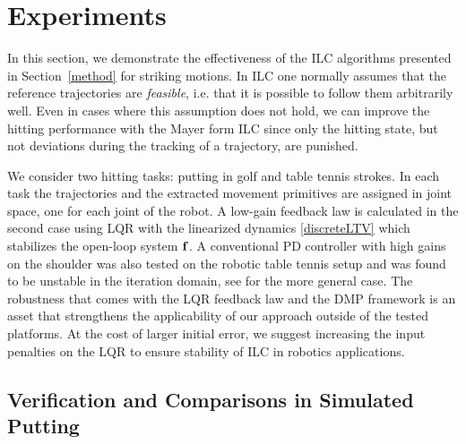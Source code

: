 \section{Experiments}\label{experiments}


In this section, we demonstrate the effectiveness of the ILC algorithms presented in Section~\ref{method} for striking motions. In ILC one normally assumes that the reference trajectories are \emph{feasible}, i.e. that it is possible to follow them arbitrarily well. Even in cases where this assumption does not hold, we can improve the hitting performance with the Mayer form ILC since only the hitting state, but not deviations during the tracking of a trajectory, are punished.

We consider two hitting tasks: putting in golf and table tennis strokes. In each task the trajectories and the extracted movement primitives are assigned in joint space, one for each joint of the robot. A low-gain feedback law is calculated in the second case using LQR with the linearized dynamics \eqref{discreteLTV} which stabilizes the open-loop system $\boldsymbol{\mathrm{f}}$. A conventional PD controller with high gains on the shoulder was also tested on the robotic table tennis setup and was found to be unstable in the iteration domain, see \cite{Bolder14} for the more general case. The robustness that comes with the LQR feedback law and the DMP framework is an asset that strengthens the applicability of our approach outside of the tested platforms. At the cost of larger initial error, we suggest increasing the input penalties on the LQR to ensure stability of ILC in robotics applications.


\subsection{Verification and Comparisons in Simulated Putting}


